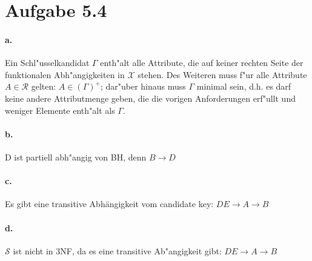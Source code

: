 \documentclass{article}
\begin{document}
	
	
	\section*{Aufgabe 5.4}
		\paragraph*{a.}Ein Schl"usselkandidat $ \Gamma $ enth"alt alle Attribute, die auf keiner rechten Seite der funktionalen Abh"angigkeiten in $ \mathcal{X} $ stehen. Des Weiteren muss f"ur alle Attribute $A \in \mathcal{R} $ gelten: $ A \in (\Gamma)^+ $; dar"uber hinaus muss $ \Gamma $ minimal sein, d.h. es darf keine andere Attributmenge geben, die die vorigen Anforderungen erf"ullt und weniger Elemente enth"alt als $ \Gamma $. \\[1.1em]
		
		
		
		\paragraph*{b.} D ist partiell abh"angig von BH, denn $ B \rightarrow D $ 
		
		
		\paragraph*{c.}Es gibt eine transitive Abhängigkeit vom candidate key: $ DE \rightarrow A \rightarrow B $
		
		
		\paragraph*{d.}$ \mathcal{S} $ ist nicht in 3NF, da es eine transitive Ab"angigkeit gibt: $ DE \rightarrow A \rightarrow B $
\end{document}
